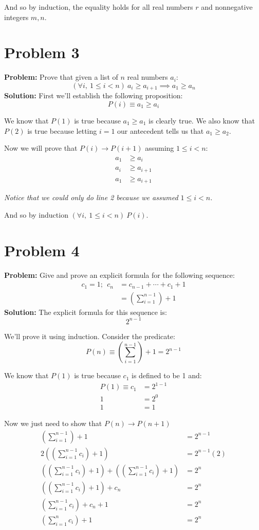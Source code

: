 \documentclass{article}
\begin{document}
And so by induction, the equality holds for all real numbers $r$ and nonnegative integers $m,n$.

\section*{Problem 3}
\textbf{Problem:} Prove that given a list of $n$ real numbers $a_i$:
$$(\forall i,\ 1\le i<n)\ a_i\ge a_{i+1}\implies a_1\ge a_n$$
\textbf{Solution:} First we'll establish the following proposition:
$$P(i)\equiv a_1\ge a_{i}$$

We know that $P(1)$ is true because $a_1\ge a_1$ is clearly true. We also know that $P(2)$ is true because letting $i=1$ our antecedent tells us that $a_1\ge a_2$.

Now we will prove that $P(i)\rightarrow P(i+1)$ assuming $1\le i<n$:
\begin{align*}
  a_1&\ge a_i\tag{given}\\
  a_i&\ge a_{i+1}\tag{plug $i$ into antecedent}\\
  a_1&\ge a_{i+1}\tag{transitive property of $\ge$}
\end{align*}

\textit{Notice that we could only do line 2 because we assumed $1\le i<n$.}

And so by induction $(\forall i,\ 1\le i<n)\ P(i)$.

\section*{Problem 4}
\textbf{Problem:} Give and prove an explicit formula for the following sequence:
\begin{align*}
  c_1=1;\ \  c_n&=c_{n-1}+\cdots+c_1+1\\
  &=\left(\sum_{i=1}^{n-1}\right)+1
\end{align*}
\textbf{Solution:} The explicit formula for this sequence is:
$$2^{n-1}$$

We'll prove it using induction. Consider the predicate:
$$P(n)\equiv \left(\sum_{i=1}^{n-1}\right)+1=2^{n-1}$$

We know that $P(1)$ is true because $c_1$ is defined to be 1 and:
\begin{align*}
  P(1)\equiv c_1&=2^{1-1}\\
  1&=2^0\\
  1&=1
\end{align*}

Now we just need to show that $P(n)\rightarrow P(n+1)$
\begin{align*}
  \left(\sum_{i=1}^{n-1}\right)+1&=2^{n-1}\\
  2\left(\left(\sum_{i=1}^{n-1}c_i\right)+1\right)&=2^{n-1}(2)\\
  \left(\left(\sum_{i=1}^{n-1}c_i\right)+1\right)+\left(\left(\sum_{i=1}^{n-1}c_i\right)+1\right)&=2^n\\
  \left(\left(\sum_{i=1}^{n-1}c_i\right)+1\right)+c_n&=2^n\tag{def. of $c_n$}\\
  \left(\sum_{i=1}^{n-1}c_i\right)+c_n+1&=2^n\\
  \left(\sum_{i=1}^nc_i\right)+1&=2^n\tag{def. finitary addition}
\end{align*}
\end{document}
